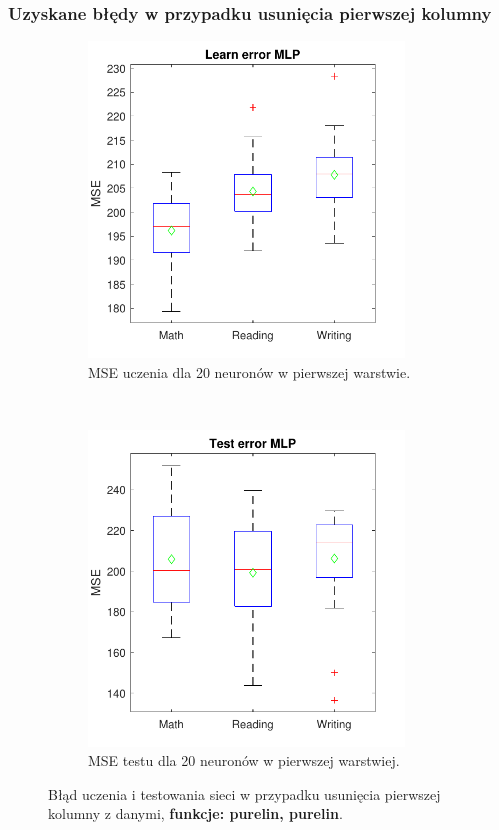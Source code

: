 \documentclass[12pt]{article}
\begin{document}
\subsubsection{Uzyskane błędy w przypadku usunięcia pierwszej kolumny}
\begin{figure}[H]
\centering
\begin{subfigure}[t]{0.48\textwidth} 
\centering
\includegraphics[height=3.3in]{purelin_purelin_20_without_1_learnBoxplot.pdf}
\caption{MSE uczenia dla  20 neuronów w pierwszej warstwie.}
\end{subfigure}
~~
\begin{subfigure}[t]{0.48\textwidth} 
\centering
\includegraphics[height=3.3in]{purelin_purelin_20_without_1_testBoxplot.pdf}
\caption{MSE testu dla  20  neuronów w pierwszej warstwiej.}
\end{subfigure}

\caption{Błąd uczenia i testowania sieci w przypadku usunięcia pierwszej kolumny z danymi, \textbf{funkcje: purelin, purelin}.}
\end{figure}
\end{document}
